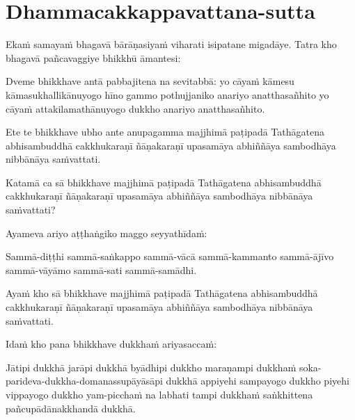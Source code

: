 \section{Dhammacakkappavattana-sutta}

\begin{pali-hang}
 Ekaṁ samayaṁ bhagavā bārāṇasiyaṁ viharati isipatane migadāye. Tatra kho bhagavā pañcavaggiye bhikkhū āmantesi:
\end{pali-hang}

\begin{pali-hang}
Dveme bhikkhave antā pabbajitena na sevitabbā: yo cāyaṁ kāmesu kāmasukhallikānuyogo hīno gammo pothujjaniko anariyo anatthasañhito yo cāyaṁ attakilamathānuyogo dukkho anariyo anatthasañhito.
\end{pali-hang}

\begin{pali-hang}
Ete te bhikkhave ubho ante anupagamma majjhimā paṭipadā Tathāgatena abhisambuddhā cakkhukaraṇī ñāṇakaraṇī upasamāya abhiññāya sambodhāya nibbānāya saṁvattati.
\end{pali-hang}

\begin{pali-hang}
Katamā ca sā bhikkhave majjhimā paṭipadā Tathāgatena abhisambuddhā cakkhukaraṇī ñāṇakaraṇī upasamāya abhiññāya sambodhāya nibbānāya saṁvattati?
\end{pali-hang}

\begin{pali-hang}
Ayameva ariyo aṭṭhaṅgiko maggo seyyathīdaṁ:
\end{pali-hang}

\begin{pali-hang}
Sammā-diṭṭhi sammā-saṅkappo sammā-vācā sammā-kammanto sammā-ājīvo sammā-vāyāmo sammā-sati sammā-samādhi.
\end{pali-hang}
Ayaṁ kho sā bhikkhave majjhimā paṭipadā Tathāgatena abhisambuddhā cakkhukaraṇī ñāṇakaraṇī upasamāya abhiññāya sambodhāya nibbānāya saṁvattati.

\begin{pali-hang}
Idaṁ kho pana bhikkhave dukkhaṁ ariyasaccaṁ:
\end{pali-hang}

\begin{pali-hang}
Jātipi dukkhā jarāpi dukkhā byādhipi dukkho maraṇampi dukkhaṁ soka-parideva-dukkha-domanassupāyāsāpi dukkhā appiyehi sampayogo dukkho piyehi vippayogo dukkho yam-picchaṁ na labhati tampi dukkhaṁ saṅkhittena pañcupādānakkhandā dukkhā.
\end{pali-hang}

